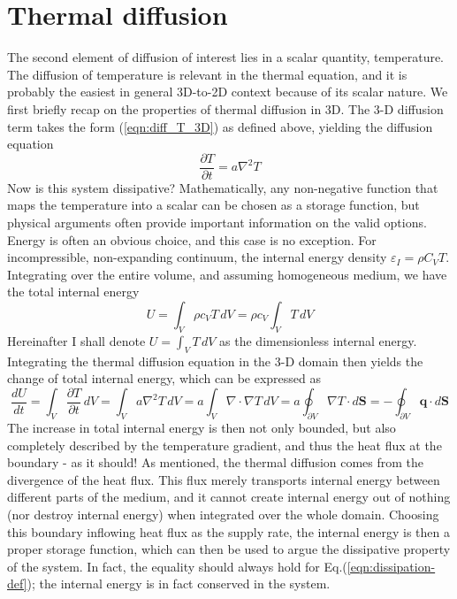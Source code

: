 \section{Thermal diffusion}

The second element of diffusion of interest lies in a scalar quantity, temperature. The diffusion of temperature is relevant in the thermal equation, and it is probably the easiest in general 3D-to-2D context because of its scalar nature. We first briefly recap on the properties of thermal diffusion in 3D. The 3-D diffusion term takes the form (\ref{eqn:diff_T_3D}) as defined above, yielding the diffusion equation
\[
    \frac{\partial T}{\partial t} = a \nabla^2 T
\]
Now is this system dissipative? Mathematically, any non-negative function that maps the temperature into a scalar can be chosen as a storage function, but physical arguments often provide important information on the valid options. Energy is often an obvious choice, and this case is no exception. For incompressible, non-expanding continuum, the internal energy density $\varepsilon_I = \rho C_V T$. Integrating over the entire volume, and assuming homogeneous medium, we have the total internal energy
\begin{equation}
    U = \int_V \rho c_V T \, dV = \rho c_V \int_V T\, dV
\end{equation}
Hereinafter I shall denote $U = \int_V T \, dV$ as the dimensionless internal energy. Integrating the thermal diffusion equation in the 3-D domain then yields the change of total internal energy, which can be expressed as
\begin{equation}
    \frac{dU}{dt} = \int_V \frac{\partial T}{\partial t} \, dV = \int_V a \nabla^2 T \, dV = a \int_V \nabla\cdot \nabla T \, dV = a \oint_{\partial V} \nabla T \cdot d \mathbf{S} = - \oint_{\partial V} \mathbf{q}\cdot d\mathbf{S}
\end{equation}
The increase in total internal energy is then not only bounded, but also completely described by the temperature gradient, and thus the heat flux at the boundary - as it should! As mentioned, the thermal diffusion comes from the divergence of the heat flux. This flux merely transports internal energy between different parts of the medium, and it cannot create internal energy out of nothing (nor destroy internal energy) when integrated over the whole domain. 
Choosing this boundary inflowing heat flux as the supply rate, the internal energy is then a proper storage function, which can then be used to argue the dissipative property of the system. In fact, the equality should always hold for Eq.(\ref{eqn:dissipation-def}); the internal energy is in fact conserved in the system.

